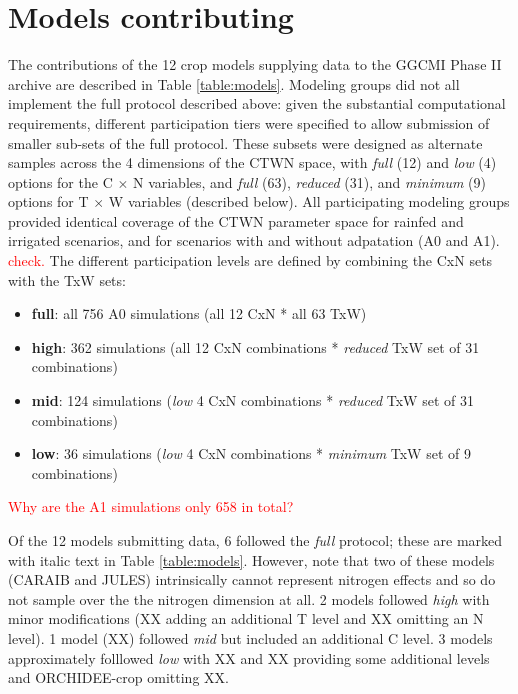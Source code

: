 \documentclass[gmd, manuscript]{copernicus} %
\begin{document}
{\section{Models contributing}

The contributions of the 12 crop models supplying data to the GGCMI Phase II archive are described in Table \ref{table:models}. 
Modeling groups did not all implement the full protocol described above:
given the substantial computational requirements, 
different participation tiers were specified to allow submission of smaller sub-sets of the full protocol. 
These subsets were designed as alternate samples across the 4 dimensions of the CTWN space,  %
with \textit{full} (12) and \textit{low} (4) options for the C $\times$ N variables, and \textit{full} (63), \textit{reduced} (31), and \textit{minimum} (9) options for T $\times$ W variables (described below). All participating modeling groups provided identical coverage of the CTWN parameter space for rainfed and irrigated scenarios, and for scenarios with and without adpatation (A0 and A1). \textcolor{red}{check.} 
The different participation levels are defined by combining the CxN sets with the TxW sets:
\begin{itemize}
\item \textbf{full}: all 756 A0 simulations (all 12 CxN * all 63 TxW)
\item \textbf{high}: 362 simulations (all 12 CxN combinations * \textit{reduced} TxW set of 31 combinations)
\item \textbf{mid}: 124 simulations (\textit{low} 4 CxN combinations * \textit{reduced} TxW set of 31 combinations)
\item \textbf{low}: 36 simulations (\textit{low} 4 CxN combinations * \textit{minimum} TxW set of 9 combinations)
\end{itemize}
\textcolor{red}{Why are the A1 simulations only 658 in total?}

Of the 12 models submitting data, 6 followed the \textit{full} protocol; these are marked with italic text in Table \ref{table:models}. However, note that two of these models (CARAIB and JULES) intrinsically cannot represent nitrogen effects and so do not sample over the the nitrogen dimension at all. 2 models followed \textit{high} with minor modifications (XX adding an additional T level and XX  omitting an N level). 1 model (XX) followed \textit{mid} but included an additional C level. 3 models approximately folllowed \textit{low} with XX and XX providing some additional levels and ORCHIDEE-crop omitting XX.  

}
\end{document}

